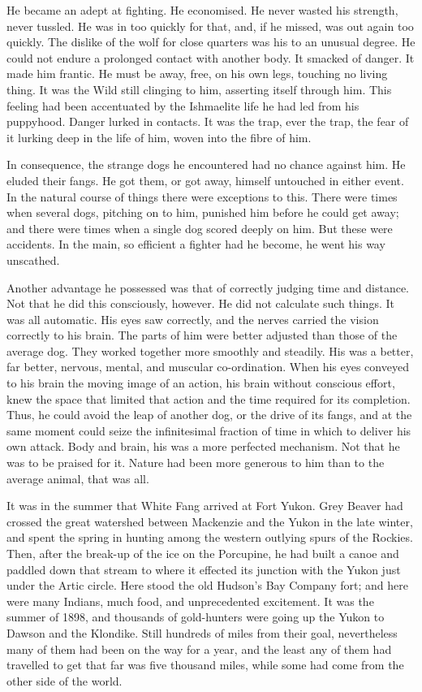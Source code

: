 \documentclass[10pt]{book}
\begin{document}
He became an adept at fighting. He economised. He never wasted his
strength, never tussled. He was in too quickly for that, and, if he
missed, was out again too quickly. The dislike of the wolf for close
quarters was his to an unusual degree. He could not endure a prolonged
contact with another body. It smacked of danger. It made him frantic.
He must be away, free, on his own legs, touching no living thing. It
was the Wild still clinging to him, asserting itself through him. This
feeling had been accentuated by the Ishmaelite life he had led from his
puppyhood. Danger lurked in contacts. It was the trap, ever the trap,
the fear of it lurking deep in the life of him, woven into the fibre of
him.

In consequence, the strange dogs he encountered had no chance against
him. He eluded their fangs. He got them, or got away, himself untouched
in either event. In the natural course of things there were exceptions
to this. There were times when several dogs, pitching on to him,
punished him before he could get away; and there were times when a
single dog scored deeply on him. But these were accidents. In the main,
so efficient a fighter had he become, he went his way unscathed.

Another advantage he possessed was that of correctly judging time and
distance. Not that he did this consciously, however. He did not
calculate such things. It was all automatic. His eyes saw correctly,
and the nerves carried the vision correctly to his brain. The parts of
him were better adjusted than those of the average dog. They worked
together more smoothly and steadily. His was a better, far better,
nervous, mental, and muscular co-ordination. When his eyes conveyed to
his brain the moving image of an action, his brain without conscious
effort, knew the space that limited that action and the time required
for its completion. Thus, he could avoid the leap of another dog, or
the drive of its fangs, and at the same moment could seize the
infinitesimal fraction of time in which to deliver his own attack. Body
and brain, his was a more perfected mechanism. Not that he was to be
praised for it. Nature had been more generous to him than to the
average animal, that was all.

It was in the summer that White Fang arrived at Fort Yukon. Grey Beaver
had crossed the great watershed between Mackenzie and the Yukon in the
late winter, and spent the spring in hunting among the western outlying
spurs of the Rockies. Then, after the break-up of the ice on the
Porcupine, he had built a canoe and paddled down that stream to where
it effected its junction with the Yukon just under the Artic circle.
Here stood the old Hudson’s Bay Company fort; and here were many
Indians, much food, and unprecedented excitement. It was the summer of
1898, and thousands of gold-hunters were going up the Yukon to Dawson
and the Klondike. Still hundreds of miles from their goal, nevertheless
many of them had been on the way for a year, and the least any of them
had travelled to get that far was five thousand miles, while some had
come from the other side of the world.
\end{document}
